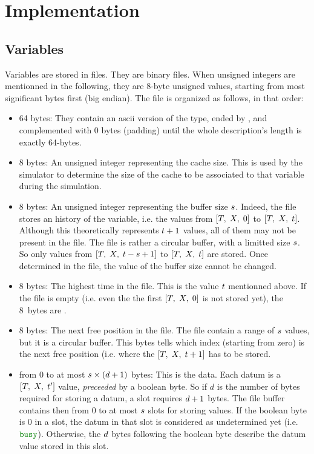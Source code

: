 \section{Implementation}

\subsection{Variables}

Variables are stored in  files. They are binary files. When unsigned integers are mentionned in the following, they are 8-byte unsigned values, starting from most significant bytes first (big endian). The file is organized as follows, in that order:
\begin{itemize}
\item 64 bytes: They contain an ascii version of the type, ended by , and complemented with 0 bytes (padding) until the whole description's length is exactly 64-bytes.
\item 8 bytes: An unsigned integer representing the cache size. This is used by the simulator to determine the size of the cache to be associated to that variable during the simulation.
\item 8 bytes: An unsigned integer representing the buffer size $s$. Indeed, the file stores an history of the variable, i.e. the values from $\left[ T,\;X,\;0 \right]$ to $\left[ T,\;X,\;t \right]$. Although this theoretically represents $t+1$ values, all of them may not be present in the file. The file is rather a circular buffer, with a limitted size $s$. So only values from $\left[ T,\;X,\;{{t} - {s}} + {1} \right]$ to $\left[ T,\;X,\;t \right]$ are stored. Once determined in the file, the value of the buffer size cannot be changed.
\item 8 bytes: The highest time in the file. This is the value $t$ mentionned above. If the file is empty (i.e. even the the first $\left[ T,\;X,\;0 \right]$ is not stored yet), the 8~bytes are .
\item 8 bytes: The next free position in the file. The file contain a range of $s$ values, but it is a circular buffer. This bytes tells which index (starting from zero) is the next free position (i.e. where the $\left[ T,\;X,\;{t} + {1} \right]$ has to be stored.
\item from 0 to at most ${s} \times {\left({d} + {1}\right)}$ bytes: This is the data. Each datum is a $\left[ T,\;X,\;t' \right]$ value, {\em preceeded} by a boolean byte. So if $d$ is the number of bytes required for storing a datum, a slot requires $d+1$ bytes. The file buffer contains then from 0 to at most $s$ slots for storing values. If the boolean byte is 0 in a slot, the datum in that slot is considered as undetermined yet (i.e. $\cxBusy$). Otherwise, the $d$ bytes following the boolean byte describe the datum value stored in this slot.
\end{itemize}
